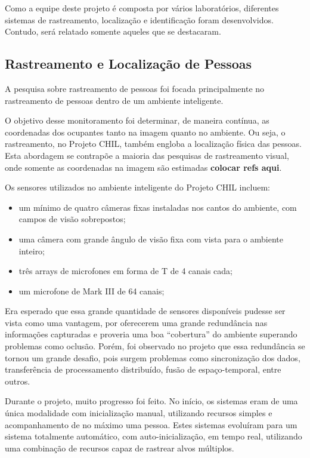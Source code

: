 Como a equipe deste projeto é composta por vários laboratórios, diferentes sistemas de rastreamento, localização e identificação foram desenvolvidos. Contudo, será relatado somente aqueles que se destacaram.

\subsection{Rastreamento e Localização de Pessoas}

A pesquisa sobre rastreamento de pessoas foi focada principalmente no rastreamento de pessoas dentro de um ambiente inteligente. 

O objetivo desse monitoramento foi determinar,  de maneira contínua, as coordenadas dos ocupantes tanto na imagem quanto no ambiente. Ou seja, o rastreamento,  no Projeto CHIL, também engloba a localização física das pessoas. Esta abordagem se contrapõe a maioria das pesquisas de rastreamento visual, onde somente as coordenadas na imagem  são estimadas  \textbf{colocar refs aqui}.

Os sensores utilizados no ambiente inteligente do Projeto CHIL incluem:	
	\begin{itemize}
		\item um mínimo de quatro câmeras fixas instaladas nos cantos do ambiente, com campos de visão sobrepostos;
		\item uma câmera com grande ângulo de visão fixa com vista para o ambiente inteiro;
		\item três arrays de microfones em forma de T de 4 canais cada;
		\item um microfone de Mark III de 64 canais;
	\end{itemize}

Era esperado que essa grande quantidade de sensores disponíveis pudesse ser vista como uma vantagem, por oferecerem uma grande redundância nas informações capturadas e proveria uma boa ``cobertura'' do ambiente superando problemas como oclusão. Porém, foi observado no projeto que essa redundância se tornou um grande desafio, pois surgem problemas como sincronização dos dados, transferência de processamento distribuído, fusão de espaço-temporal, entre outros.

Durante o projeto, muito progresso foi feito. No início, os sistemas eram de uma única modalidade com inicialização manual, utilizando recursos simples e acompanhamento de no máximo uma pessoa. Estes sistemas evoluíram para um sistema totalmente automático, com auto-inicialização, em tempo real, utilizando uma combinação de recursos capaz de rastrear alvos múltiplos.

